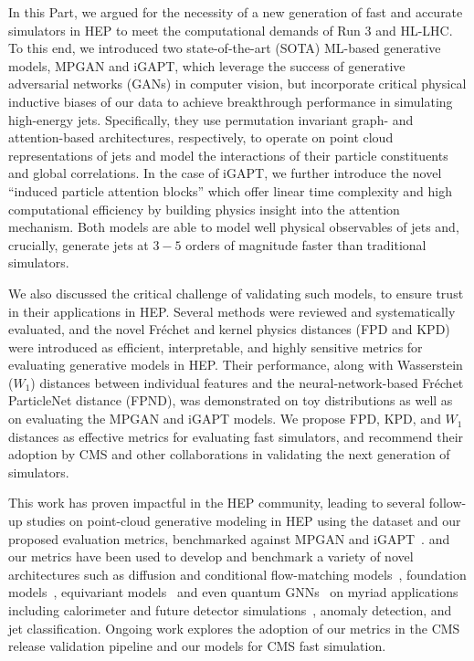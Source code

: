 In this Part, we argued for the necessity of a new generation of fast and accurate simulators in HEP to meet the computational demands of Run 3 and HL-LHC.
To this end, we introduced two state-of-the-art (SOTA) ML-based generative models, MPGAN and iGAPT, which leverage the success of generative adversarial networks (GANs) in computer vision, but incorporate critical physical inductive biases of our data to achieve breakthrough performance in simulating high-energy jets.
Specifically, they use permutation invariant graph- and attention-based architectures, respectively, to operate on point cloud representations of jets and model the interactions of their particle constituents and global correlations.
In the case of iGAPT, we further introduce the novel ``induced particle attention blocks'' which offer linear time complexity and high computational efficiency by building physics insight into the attention mechanism.
Both models are able to model well physical observables of jets and, crucially, generate jets at $3-5$ orders of magnitude faster than traditional simulators.

We also discussed the critical challenge of validating such models, to ensure trust in their applications in HEP.
Several methods were reviewed and systematically evaluated, and the novel Fr\'echet and kernel physics distances (FPD and KPD) were introduced as efficient, interpretable, and highly sensitive metrics for evaluating generative models in HEP.
Their performance, along with Wasserstein ($W_1$) distances between individual features and the neural-network-based Fr\'echet ParticleNet distance (FPND), was demonstrated on toy distributions as well as on evaluating the MPGAN and iGAPT models.
We propose FPD, KPD, and $W_1$ distances as effective metrics for evaluating fast simulators, and recommend their adoption by CMS and other collaborations in validating the next generation of simulators.

This work has proven impactful in the HEP community, leading to several follow-up studies on point-cloud generative modeling in HEP using the \jetnet dataset and our proposed evaluation metrics, benchmarked against MPGAN and iGAPT~\cite{Kach:2022qnf, Kach:2022uzq, Buhmann:2023pmh, Leigh:2023toe, Mikuni:2023dvk, Kach:2023rqw, Leigh:2023zle, Scham:2023cwn, Scham:2023usu, Buhmann:2023zgc, Jiang:2024ohg}.
\jetnet and our metrics have been used to develop and benchmark a variety of novel architectures such as diffusion and conditional flow-matching models~\cite{Mikuni:2023dvk, Buhmann:2023zgc, Jiang:2024ohg, Jiang:2024bwr}, foundation models~\cite{Mikuni:2024qsr}, equivariant models~\cite{Hao:2022zns} and even quantum GNNs~\cite{Chen:2024rna} on myriad applications including calorimeter and future detector simulations~\cite{Krause:2024avx, Araz:2024bom}, anomaly detection, and jet classification.
Ongoing work explores the adoption of our metrics in the CMS release validation pipeline and our models for CMS fast simulation.
